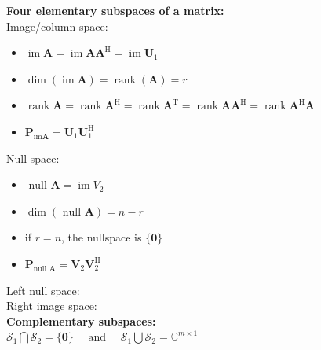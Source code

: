 \documentclass[english]{latex4ei/latex4ei_sheet}
\begin{document}
\begin{sectionbox}
\begin{itemize}
  \end{itemize}
  \textbf{Four elementary subspaces of a matrix:}\\
  Image/column space:
  \begin{itemize}
    \item $\operatorname{im} \boldsymbol{A}=\operatorname{im} \boldsymbol{A} \boldsymbol{A}^{\mathrm{H}}=\operatorname{im} \boldsymbol{U}_{1}$
    \item $\operatorname{dim}(\operatorname{im} \boldsymbol{A})= \operatorname{rank}(\boldsymbol{A}) = r$
    \item $\operatorname{rank} \boldsymbol{A}=\operatorname{rank} \boldsymbol{A}^{\mathrm{H}}=\operatorname{rank} \boldsymbol{A}^{\mathrm{T}}=\operatorname{rank} \boldsymbol{A} \boldsymbol{A}^{\mathrm{H}}=\operatorname{rank} \boldsymbol{A}^{\mathrm{H}} \boldsymbol{A}$
    \item $\boldsymbol{P}_{\mathrm{im} \boldsymbol{A}}=\boldsymbol{U}_{1} \boldsymbol{U}_{1}^{\mathrm{H}}$
  \end{itemize}
  Null space:
  \begin{itemize}
    \item $\text { null } \boldsymbol{A}=\operatorname{im} V_{2}$
    \item $\operatorname{dim}(\text { null } \boldsymbol{A})=n-r$
    \item if $r=n$, the nullspace is $\{\mathbf{0}\}$
    \item $\boldsymbol{P}_{\text {null } \boldsymbol{A}}=\boldsymbol{V}_{2} \boldsymbol{V}_{2}^{\mathrm{H}}$
  \end{itemize}
  Left null space:\\
  Right image space:\\

  \textbf{Complementary subspaces:}\\
  $\mathcal{S}_{1} \bigcap \mathcal{S}_{2}=\{\boldsymbol{0}\} \quad \text { and } \quad \mathcal{S}_{1} \bigcup \mathcal{S}_{2}=\mathbb{C}^{m \times 1}$
\end{sectionbox}
\end{document}

